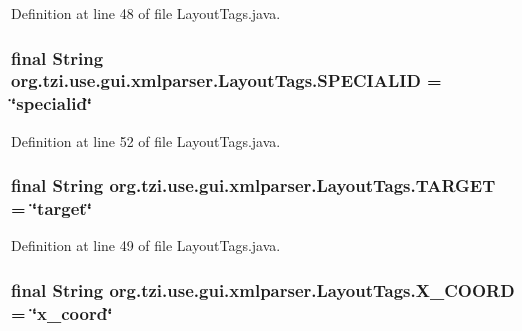 Definition at line 48 of file Layout\-Tags.\-java.

\hypertarget{classorg_1_1tzi_1_1use_1_1gui_1_1xmlparser_1_1_layout_tags_aaa49cb31739887fee8ee20765735a5ef}{
\subsubsection[{S\-P\-E\-C\-I\-A\-L\-I\-D}]{\setlength{\rightskip}{0pt plus 5cm}final String org.\-tzi.\-use.\-gui.\-xmlparser.\-Layout\-Tags.\-S\-P\-E\-C\-I\-A\-L\-I\-D = \char`\"{}specialid\char`\"{}\hspace{0.3cm}{\ttfamily [static]}}}\label{classorg_1_1tzi_1_1use_1_1gui_1_1xmlparser_1_1_layout_tags_aaa49cb31739887fee8ee20765735a5ef}


Definition at line 52 of file Layout\-Tags.\-java.

\hypertarget{classorg_1_1tzi_1_1use_1_1gui_1_1xmlparser_1_1_layout_tags_aba154c46e6dc876b74f52689bbfd1c03}{
\subsubsection[{T\-A\-R\-G\-E\-T}]{\setlength{\rightskip}{0pt plus 5cm}final String org.\-tzi.\-use.\-gui.\-xmlparser.\-Layout\-Tags.\-T\-A\-R\-G\-E\-T = \char`\"{}target\char`\"{}\hspace{0.3cm}{\ttfamily [static]}}}\label{classorg_1_1tzi_1_1use_1_1gui_1_1xmlparser_1_1_layout_tags_aba154c46e6dc876b74f52689bbfd1c03}


Definition at line 49 of file Layout\-Tags.\-java.

\hypertarget{classorg_1_1tzi_1_1use_1_1gui_1_1xmlparser_1_1_layout_tags_a34a3b4b2ac82ba95d08d594fe74dc7bc}{
\subsubsection[{X\-\_\-\-C\-O\-O\-R\-D}]{\setlength{\rightskip}{0pt plus 5cm}final String org.\-tzi.\-use.\-gui.\-xmlparser.\-Layout\-Tags.\-X\-\_\-\-C\-O\-O\-R\-D = \char`\"{}x\-\_\-coord\char`\"{}\hspace{0.3cm}{\ttfamily [static]}}}\label{classorg_1_1tzi_1_1use_1_1gui_1_1xmlparser_1_1_layout_tags_a34a3b4b2ac82ba95d08d594fe74dc7bc}


